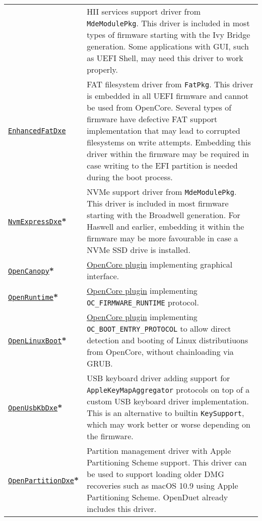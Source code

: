 \documentclass[]{article}
\begin{document}
\begin{longtable}{p{1.3in}p{5.55in}}
& HII services support driver from \texttt{MdeModulePkg}. This driver is included in
  most types of firmware starting with the Ivy Bridge generation. Some applications with GUI,
  such as UEFI Shell, may need this driver to work properly. \\
\href{https://github.com/acidanthera/audk}{\texttt{EnhancedFatDxe}}
& FAT filesystem driver from \texttt{FatPkg}. This driver is embedded in all
  UEFI firmware and cannot be used from OpenCore. Several types of firmware
  have defective FAT support implementation that may lead to corrupted filesystems
  on write attempts. Embedding this driver within the firmware may be required in case
  writing to the EFI partition is needed during the boot process. \\
\href{https://github.com/acidanthera/audk}{\texttt{NvmExpressDxe}}\textbf{*}
& NVMe support driver from \texttt{MdeModulePkg}. This driver is included in most
  firmware starting with the Broadwell generation. For Haswell and earlier, embedding it
  within the firmware may be more favourable in case a NVMe SSD drive is installed. \\
\href{https://github.com/acidanthera/OpenCorePkg}{\texttt{OpenCanopy}}\textbf{*}
& \hyperref[ueficanopy]{OpenCore plugin} implementing graphical interface. \\
\href{https://github.com/acidanthera/OpenCorePkg}{\texttt{OpenRuntime}}\textbf{*}
& \hyperref[uefiruntime]{OpenCore plugin} implementing \texttt{OC\_FIRMWARE\_RUNTIME} protocol. \\
\href{https://github.com/acidanthera/OpenCorePkg}{\texttt{OpenLinuxBoot}}\textbf{*}
& \hyperref[uefilinux]{OpenCore plugin} implementing \texttt{OC\_BOOT\_ENTRY\_PROTOCOL}
  to allow direct detection and booting of Linux distributiuons from OpenCore, without
  chainloading via GRUB. \\
\href{https://github.com/acidanthera/OpenCorePkg}{\texttt{OpenUsbKbDxe}}\textbf{*}
& USB keyboard driver adding support for \texttt{AppleKeyMapAggregator} protocols
  on top of a custom USB keyboard driver implementation. This is an alternative to
  builtin \texttt{KeySupport}, which may work better or worse depending on the firmware. \\
\href{https://github.com/acidanthera/OcBinaryData}{\texttt{OpenPartitionDxe}}\textbf{*}
& Partition management driver with Apple Partitioning Scheme support.
  This driver can be used to support loading older DMG recoveries such as
  macOS 10.9 using Apple Partitioning Scheme. OpenDuet already includes this driver. \\

\end{longtable}
\end{document}
